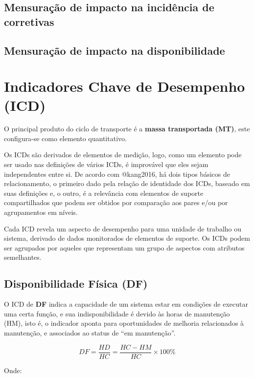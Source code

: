 \documentclass[
  letterpaper,
]{book}
\begin{document}
\subsection{Mensuração de impacto na incidência de
corretivas}\label{mensurauxe7uxe3o-de-impacto-na-inciduxeancia-de-corretivas}

\subsection{Mensuração de impacto na
disponibilidade}\label{mensurauxe7uxe3o-de-impacto-na-disponibilidade}

\section{Indicadores Chave de Desempenho (ICD)}\label{sec-icd}

O principal produto do ciclo de transporte é a \textbf{massa
transportada (MT)}, este configura-se como elemento quantitativo.

Os ICDs são derivados de elementos de medição, logo, como um elemento
pode ser usado nas definições de vários ICDs, é improvável que eles
sejam independentes entre si. De acordo com @kang2016, há dois tipos
básicos de relacionamento, o primeiro dado pela relação de identidade
dos ICDs, baseado em suas definições e, o outro, é a relevância com
elementos de suporte compartilhados que podem ser obtidos por comparação
aos pares e/ou por agrupamentos em níveis.

Cada ICD revela um aspecto de desempenho para uma unidade de trabalho ou
sistema, derivado de dados monitorados de elementos de suporte. Os ICDs
podem ser agrupados por aqueles que representam um grupo de aspectos com
atributos semelhantes.

\subsection{Disponibilidade Física
(DF)}\label{disponibilidade-fuxedsica-df}

O ICD de \textbf{DF} indica a capacidade de um sistema estar em
condições de executar uma certa função, e sua indisponibilidade é devido
às horas de manutenção (HM), isto é, o indicador aponta para
oportunidades de melhoria relacionados à manutenção, e associados ao
status de ``em manutenção''.

\[
DF = \frac{HD}{HC} = \frac{HC - HM}{HC} \times 100\%
\]

Onde:
\end{document}

